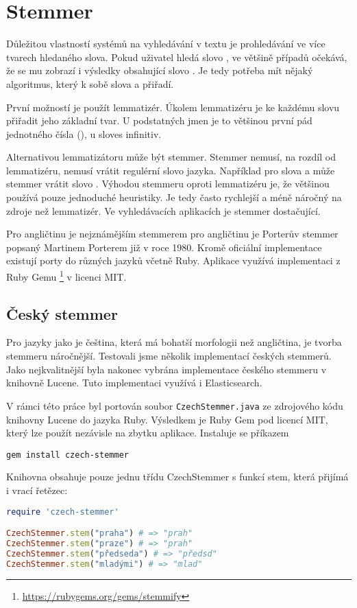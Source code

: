 \chapter{Stemmer}
\label{chap:stemmer}

Důležitou vlastností systémů na vyhledávání v textu je prohledávání ve více tvarech hledaného slova. Pokud uživatel hledá slovo , ve většině případů očekává, že se mu zobrazí i výsledky obsahující slovo . Je tedy potřeba mít nějaký algoritmus, který k sobě slova  a  přiřadí.

První možností je použít lemmatizér. Úkolem lemmatizéru je ke každému slovu přiřadit jeho základní tvar. U podstatných jmen je to většinou první pád jednotného čísla (), u sloves infinitiv.

Alternativou lemmatizátoru může být stemmer. Stemmer nemusí, na rozdíl od lemmatizéru, nemusí vrátit regulérní slovo jazyka. Například pro slova  a  může stemmer vrátit slovo . Výhodou stemmeru oproti lemmatizéru je, že většinou používá pouze jednoduché heuristiky. Je tedy často rychlejší a méně náročný na zdroje než lemmatizér. Ve vyhledávacích aplikacích je stemmer dostačující.

Pro angličtinu je nejznámějším stemmerem pro angličtinu je Porterův stemmer\cite{porter80} popsaný Martinem Porterem již v roce 1980. Kromě oficiální implementace existují porty do různých jazyků včetně Ruby. Aplikace využívá implementaci z Ruby Gemu \footnote{\url{https://rubygems.org/gems/stemmify}} v licenci MIT.


\section{Český stemmer}
Pro jazyky jako je čeština, která má bohatší morfologii než angličtina, je tvorba stemmeru náročnější. Testovali jsme několik implementací českých stemmerů. Jako nejkvalitnější byla nakonec vybrána implementace českého stemmeru v knihovně Lucene. Tuto implementaci využívá i Elasticsearch.

V rámci této práce byl portován soubor \lstinline{CzechStemmer.java} ze zdrojového kódu knihovny Lucene do jazyka Ruby. Výsledkem je Ruby Gem pod licencí MIT, který lze použít nezávisle na zbytku aplikace. Instaluje se příkazem

\begin{lstlisting}
gem install czech-stemmer
\end{lstlisting}

Knihovna obsahuje pouze jednu třídu CzechStemmer s funkcí stem, která přijímá i vrací řetězec:

\begin{lstlisting}[language=ruby]
require 'czech-stemmer'

CzechStemmer.stem("praha") # => "prah"
CzechStemmer.stem("praze") # => "prah"
CzechStemmer.stem("předseda") # => "předsd"
CzechStemmer.stem("mladými") # => "mlad"
\end{lstlisting}
